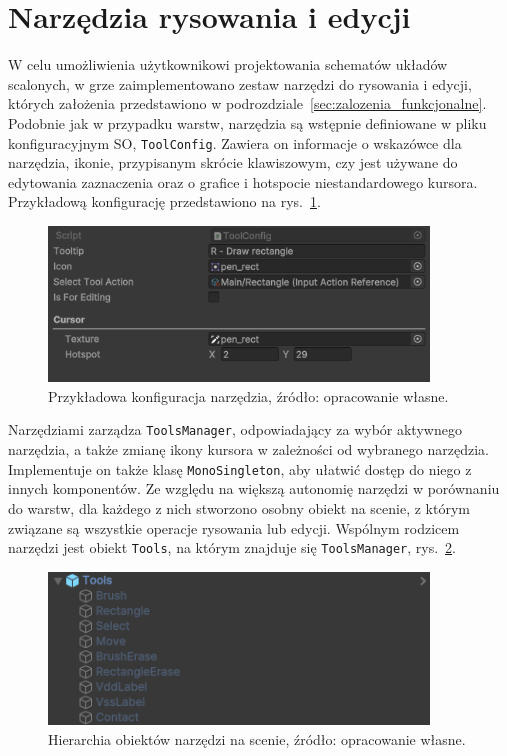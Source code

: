 \section{Narzędzia rysowania i edycji}
\label{sec:narzedzia_rysowania_i_edycji}

W celu umożliwienia użytkownikowi projektowania schematów układów scalonych,
w grze zaimplementowano zestaw narzędzi do rysowania i edycji, których założenia przedstawiono w podrozdziale~\ref{sec:zalozenia_funkcjonalne}.
Podobnie jak w przypadku warstw, narzędzia są wstępnie definiowane w pliku konfiguracyjnym SO, \texttt{ToolConfig}.
Zawiera on informacje o wskazówce dla narzędzia, ikonie, przypisanym skrócie klawiszowym, czy jest używane do edytowania zaznaczenia
oraz o grafice i hotspocie niestandardowego kursora.
Przykładową konfigurację przedstawiono na rys.~\ref{fig:tool_config}.

\begin{figure}[h!]
    \centering
    \includegraphics[width=0.9\textwidth]{chapters/chapter4/rys/tool_config}
    \caption[Przykładowa konfiguracja narzędzia.]{Przykładowa konfiguracja narzędzia, źródło: opracowanie własne.}
    \label{fig:tool_config}
\end{figure}

Narzędziami zarządza \texttt{ToolsManager}, odpowiadający za wybór aktywnego narzędzia,
a także zmianę ikony kursora w zależności od wybranego narzędzia.
Implementuje on także klasę \texttt{MonoSingleton}, aby ułatwić dostęp do niego z innych komponentów.
Ze względu na większą autonomię narzędzi w porównaniu do warstw,
dla każdego z nich stworzono osobny obiekt na scenie, z którym związane są wszystkie operacje rysowania lub edycji.
Wspólnym rodzicem narzędzi jest obiekt \texttt{Tools}, na którym znajduje się \texttt{ToolsManager},
rys.~\ref{fig:tools_hierarchy}.

\begin{figure}[h!]
    \centering
    \includegraphics[width=0.9\textwidth]{chapters/chapter4/rys/tools_hierarchy}
    \caption[Hierarchia obiektów narzędzi na scenie.]{Hierarchia obiektów narzędzi na scenie, źródło: opracowanie własne.}
    \label{fig:tools_hierarchy}
\end{figure}

